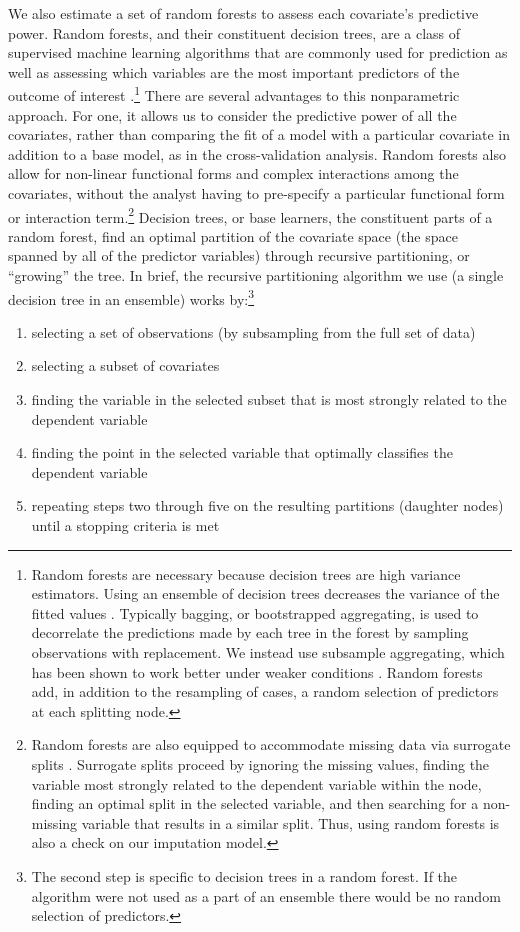 \documentclass[11pt]{article}
\begin{document}
We also estimate a set of random forests to assess each covariate's predictive power. Random forests, and their constituent decision trees, are a class of supervised machine learning algorithms that are commonly used for prediction as well as assessing which variables are the most important predictors of the outcome of interest  \citep{breiman2001random}.\footnote{Random forests are necessary because decision trees are high variance estimators. Using an ensemble of decision trees decreases the variance of the fitted values \citep{berk2008statistical, murphy2012machine}. Typically bagging, or bootstrapped aggregating, is used to decorrelate the predictions made by each tree in the forest by sampling observations with replacement. We instead use subsample aggregating, which has been shown to work better under weaker conditions \citep{politis-sub, strobl2007bias}. Random forests add, in addition to the resampling of cases, a random selection of predictors at each splitting node.} There are several advantages to this nonparametric approach. For one, it allows us to consider the predictive power of all the covariates, rather than comparing the fit of a model with a particular covariate in addition to a base model, as in the cross-validation analysis. Random forests also allow for non-linear functional forms and complex interactions among the covariates, without the analyst having to pre-specify a particular functional form or interaction term.\footnote{Random forests are also equipped to accommodate missing data via surrogate splits \citep{hothorn2006unbiased}. Surrogate splits proceed by ignoring the missing values, finding the variable most strongly related to the dependent variable within the node, finding an optimal split in the selected variable, and then searching for a non-missing variable that results in a similar split. Thus, using random forests is also a check on our imputation model.} Decision trees, or base learners, the constituent parts of a random forest, find an optimal partition of the covariate space (the space spanned by all of the predictor variables) through recursive partitioning, or ``growing'' the tree. In brief, the recursive partitioning algorithm we use (a single decision tree in an ensemble) works by:\footnote{The second step is specific to decision trees in a random forest. If the algorithm were not used as a part of an ensemble there would be no random selection of predictors.}
\begin{enumerate}
\item selecting a set of observations (by subsampling from the full set of data)
\item selecting a subset of covariates
\item finding the variable in the selected subset that is most strongly related to the dependent variable
\item finding the point in the selected variable that optimally classifies the dependent variable
\item repeating steps two through five on the resulting partitions (daughter nodes) until a stopping criteria is met
\end{enumerate}
\end{document}
